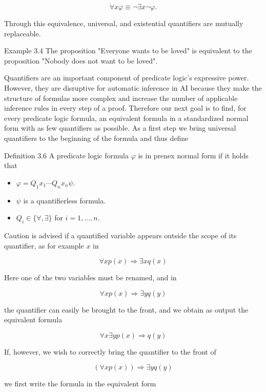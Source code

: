 \documentclass[10pt]{book}
\begin{document}
$$
\forall x \varphi \equiv \neg \exists x \neg \varphi .
$$

Through this equivalence, universal, and existential quantifiers are mutually replaceable.


Example 3.4 The proposition "Everyone wants to be loved" is equivalent to the proposition "Nobody does not want to be loved".

Quantifiers are an important component of predicate logic's expressive power. However, they are disruptive for automatic inference in AI because they make the structure of formulas more complex and increase the number of applicable inference rules in every step of a proof. Therefore our next goal is to find, for every predicate logic formula, an equivalent formula in a standardized normal form with as few quantifiers as possible. As a first step we bring universal quantifiers to the beginning of the formula and thus define

Definition 3.6 A predicate logic formula $\varphi$ is in prenex normal form if it holds that

\begin{itemize}
  \item $\varphi=Q_{1} x_{1} \cdots Q_{n} x_{n} \psi$.
  \item $\psi$ is a quantifierless formula.
  \item $Q_{i} \in\{\forall, \exists\}$ for $i=1, \ldots, n$.
\end{itemize}

Caution is advised if a quantified variable appears outside the scope of its quantifier, as for example $x$ in

$$
\forall x p(x) \Rightarrow \exists x q(x)
$$

Here one of the two variables must be renamed, and in

$$
\forall x p(x) \Rightarrow \exists y q(y)
$$

the quantifier can easily be brought to the front, and we obtain as output the equivalent formula

$$
\forall x \exists y p(x) \Rightarrow q(y)
$$

If, however, we wish to correctly bring the quantifier to the front of


\begin{equation*}
(\forall x p(x)) \Rightarrow \exists y q(y) \tag{3.4}
\end{equation*}


we first write the formula in the equivalent form
\end{document}

